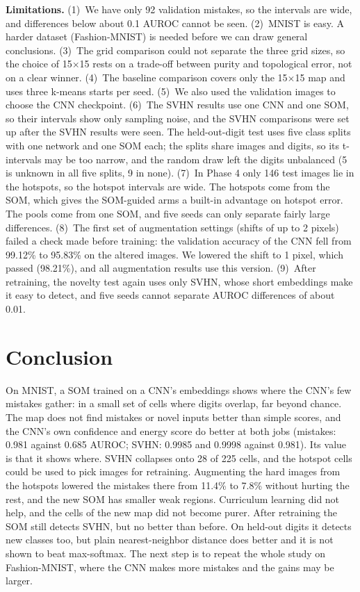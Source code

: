 \documentclass[11pt]{article}
\begin{document}
\textbf{Limitations.}
(1)~We have only 92 validation mistakes, so the intervals are wide, and differences below about 0.1 AUROC cannot be seen.
(2)~MNIST is easy. A harder dataset (Fashion-MNIST) is needed before we can draw general conclusions.
(3)~The grid comparison could not separate the three grid sizes, so the choice of 15$\times$15 rests on a trade-off between purity and topological error, not on a clear winner.
(4)~The baseline comparison covers only the 15$\times$15 map and uses three k-means starts per seed.
(5)~We also used the validation images to choose the CNN checkpoint.
(6)~The SVHN results use one CNN and one SOM, so their intervals show only sampling noise, and the SVHN comparisons were set up after the SVHN results were seen. The held-out-digit test uses five class splits with one network and one SOM each; the splits share images and digits, so its t-intervals may be too narrow, and the random draw left the digits unbalanced (5 is unknown in all five splits, 9 in none).
(7)~In Phase 4 only 146 test images lie in the hotspots, so the hotspot intervals are wide. The hotspots come from the SOM, which gives the SOM-guided arms a built-in advantage on hotspot error. The pools come from one SOM, and five seeds can only separate fairly large differences.
(8)~The first set of augmentation settings (shifts of up to 2 pixels) failed a check made before training: the validation accuracy of the CNN fell from 99.12\% to 95.83\% on the altered images. We lowered the shift to 1 pixel, which passed (98.21\%), and all augmentation results use this version.
(9)~After retraining, the novelty test again uses only SVHN, whose short embeddings make it easy to detect, and five seeds cannot separate AUROC differences of about 0.01.

\section{Conclusion}

On MNIST, a SOM trained on a CNN's embeddings shows where the CNN's few mistakes gather: in a small set of cells where digits overlap, far beyond chance. The map does not find mistakes or novel inputs better than simple scores, and the CNN's own confidence and energy score do better at both jobs (mistakes: 0.981 against 0.685 AUROC; SVHN: 0.9985 and 0.9998 against 0.981).
Its value is that it shows where. SVHN collapses onto 28 of 225 cells, and the hotspot cells could be used to pick images for retraining. Augmenting the hard images from the hotspots lowered the mistakes there from 11.4\% to 7.8\% without hurting the rest, and the new SOM has smaller weak regions. Curriculum learning did not help, and the cells of the new map did not become purer.
After retraining the SOM still detects SVHN, but no better than before. On held-out digits it detects new classes too, but plain nearest-neighbor distance does better and it is not shown to beat max-softmax. The next step is to repeat the whole study on Fashion-MNIST, where the CNN makes more mistakes and the gains may be larger.

\clearpage
\printbibliography[title={References}]
\end{document}
